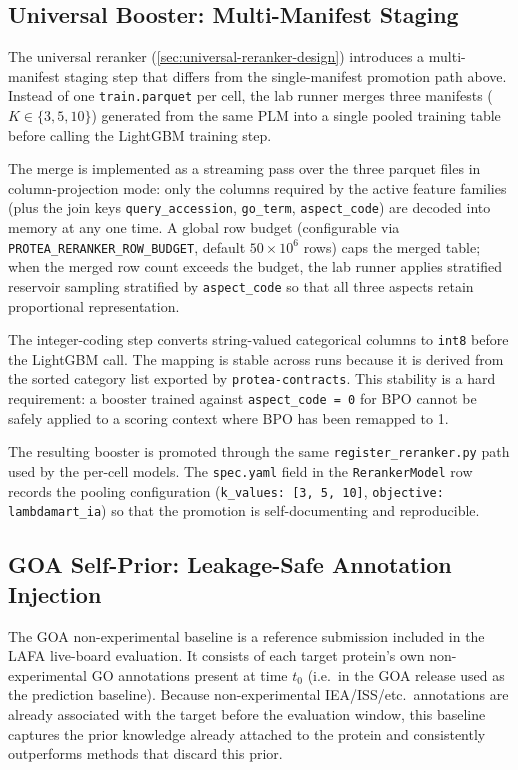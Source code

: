 \subsection{Universal Booster: Multi-Manifest Staging}
\label{subsec:impl-universal-staging}

The universal reranker (\cref{sec:universal-reranker-design}) introduces a
multi-manifest staging step that differs from the single-manifest promotion
path above. Instead of one \texttt{train.parquet} per cell, the lab runner
merges three manifests ($K \in \{3, 5, 10\}$) generated from the same PLM
into a single pooled training table before calling the LightGBM training step.

The merge is implemented as a streaming pass over the three parquet files in
column-projection mode: only the columns required by the active feature
families (plus the join keys \texttt{query\_accession}, \texttt{go\_term},
\texttt{aspect\_code}) are decoded into memory at any one time. A global row
budget (configurable via \texttt{PROTEA\_RERANKER\_ROW\_BUDGET}, default
$50 \times 10^6$ rows) caps the merged table; when the merged row count
exceeds the budget, the lab runner applies stratified reservoir sampling
stratified by \texttt{aspect\_code} so that all three aspects retain
proportional representation.

The integer-coding step converts string-valued categorical columns to
\texttt{int8} before the LightGBM call. The mapping is stable across runs
because it is derived from the sorted category list exported by
\texttt{protea-contracts}. This stability is a hard requirement: a booster
trained against \texttt{aspect\_code = 0} for BPO cannot be safely applied to
a scoring context where BPO has been remapped to 1.

The resulting booster is promoted through the same
\texttt{register\_reranker.py} path used by the per-cell models. The
\texttt{spec.yaml} field in the \texttt{RerankerModel} row records the pooling
configuration (\texttt{k\_values: [3, 5, 10]}, \texttt{objective:
lambdamart\_ia}) so that the promotion is self-documenting and reproducible.

\subsection{GOA Self-Prior: Leakage-Safe Annotation Injection}
\label{subsec:impl-goa-self-prior}

The GOA non-experimental baseline is a reference submission included in the
LAFA live-board evaluation. It consists of each target protein's own non-experimental
GO annotations present at time $t_0$ (i.e.\ in the GOA release used as the
prediction baseline). Because non-experimental IEA/ISS/etc.\ annotations are
already associated with the target before the evaluation window, this baseline
captures the prior knowledge already attached to the protein and consistently
outperforms methods that discard this prior.

